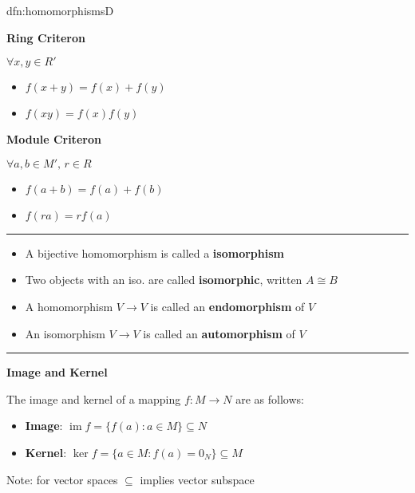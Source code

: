 \documentclass[landscape, 8pt]{extarticle}
\DeclareMathOperator{\im}{im}
\begin{document}
\begin{multicols}{3}
\begin{dfn}{dfn:homomorphisms}{D}
\begin{multicols}{3}
        \columnbreak    

        \textbf{Ring Criteron}

        $\forall x, y\in R'$
        \begin{itemize}[leftmargin=*]
            \item $f (x + y) = f(x) + f(y)$
            \item $f(xy) = f(x)f(y)$
        \end{itemize}

        \columnbreak

        \textbf{Module Criteron}

        $\forall a, b\in M',\,r\in R$
        \begin{itemize}[leftmargin=*]
            \item $f(a + b) = f(a) + f(b)$
            \item $f(ra) = rf(a)$
        \end{itemize}
    \end{multicols}
    \setlength{\columnseprule}{0pt}

    \noindent\rule{\textwidth}{0.2pt}

    \begin{itemize}[leftmargin=*]
        \setlength\itemsep{0em}
        \item A bijective homomorphism is called a \textbf{isomorphism}
        \item Two objects with an iso. are called \textbf{isomorphic}, written $A \cong B$
        \item A homomorphism $V\to V$ is called an \textbf{endomorphism} of $V$
        \item An isomorphism $V\to V$ is called an \textbf{automorphism} of $V$
    \end{itemize}

    \noindent\rule{\textwidth}{0.2pt}

    \textbf{Image and Kernel}

    The image and kernel of a mapping $f : M \to N$ are as follows:

    \begin{itemize}
        \setlength\itemsep{0em}
        \item \textbf{Image}: $\im f = \{f(a) : a\in M\}\subseteq N$
        \item \textbf{Kernel}: $\ker f = \{a\in M : f(a) = 0_{N}\} \subseteq M$
    \end{itemize}

    Note: for vector spaces $\subseteq$ implies vector subspace


\end{dfn}
\end{multicols}
\end{document}
